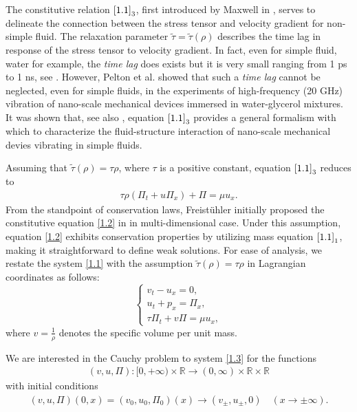 \documentclass[10pt,reqno]{amsart}
\numberwithin{equation}{section}
\begin{document}
The constitutive relation $\eqref{1.1}_3$, first introduced by Maxwell in \cite{MAX}, serves to delineate the connection between the stress tensor and velocity gradient for non-simple fluid. The relaxation parameter $\tilde\tau=\tilde \tau(\rho)$ describes the time lag in response of the stress tensor to velocity gradient. In fact, even for simple fluid, water for example, the {\it {time lag}} does exists but it is very small ranging from 1 ps to 1 ns, see \cite{GM, FS}. However, Pelton et al. \cite{MP} showed that such a {\it time lag} cannot be neglected, even for simple fluids, in the experiments of high-frequency (20 GHz) vibration of nano-scale mechanical devices immersed in water-glycerol mixtures. It was shown that, see also \cite{DJE}, equation $\eqref{1.1}_3$ provides a general formalism with which to characterize the fluid-structure interaction of nano-scale mechanical devies vibrating in simple fluids.

Assuming that $\tilde \tau(\rho)=\tau \rho$, where $\tau$ is a positive constant, equation $\eqref{1.1}_3$ reduces to
\begin{align}\label{1.2}
\tau  \rho (\Pi_t+ u \Pi_x)+\Pi=\mu u_x.
\end{align}
From the standpoint of conservation laws, Freist\"uhler initially proposed the constitutive equation \eqref{1.2} in \cite{FRE1, FRE2} in multi-dimensional case. Under this assumption, equation \eqref{1.2} exhibits conservation properties by utilizing mass equation $\eqref{1.1}_1$, making it straightforward to define weak solutions. For ease of analysis, we restate the system \eqref{1.1} with the assumption $\tilde \tau(\rho)=\tau \rho$ in Lagrangian coordinates as follows:
\begin{equation}\label{1.3}
\begin{cases}
v_t-u_x=0,\\
u_t+p_x=\Pi_x,\\
\tau \Pi_t+v\Pi=\mu u_x,
\end{cases}
\end{equation}
where $v=\frac{1}{\rho}$ denotes the specific volume per unit mass.

We are interested in the Cauchy problem to system \eqref{1.3} for the functions
\begin{align*}
(v, u, \Pi): [0, +\infty) \times \mathbb R \rightarrow (0, \infty)\times \mathbb R \times \mathbb R
\end{align*}
with initial conditions
\begin{align} \label{1.4}
(v, u, \Pi)(0,x)=(v_0, u_0, \Pi_0)(x)\rightarrow(v_{\pm},u_{\pm},0) \quad (x\rightarrow\pm\infty).
\end{align}
\end{document}
